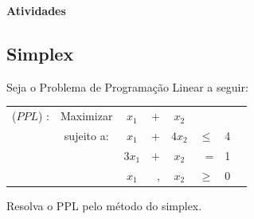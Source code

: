 \documentclass[12pt]{exam}
\begin{document}



\printanswers

\begin{center}
\textbf{{\Huge Atividades}}
\end{center}

\begin{questions}

\section*{Simplex}

\question Seja o Problema de Programação Linear a seguir:
	
	\begin{table}[H]
		\centering
			\begin{tabular}{c c c r c r c c }
			($PPL$) :&  Maximizar & $x_1$ & + & $x_2$   &  & &	\\
			& sujeito a: & $x_1$ & + & $4x_2$  & $\leq $ &	 4 \\
			 & & $3x_1$ & $+$ & $x_2$ &  = &	 1 \\
			 & & $x_1$ & , & $x_2$ &  $\geq$ &	 0
			\end{tabular}
	\end{table}	
	Resolva o PPL pelo método do simplex.
	
	\begin{solution}


\end{solution}
\end{questions}
\end{document}
